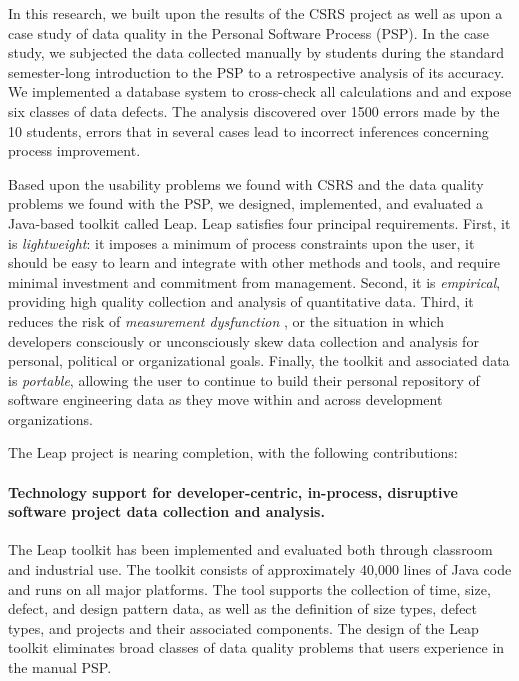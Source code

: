 In this research, we built upon the results of
the CSRS project as well as upon a case study of data quality in the Personal
Software Process (PSP).  In the case study, we subjected the data collected
manually by students during the standard semester-long introduction to the
PSP to a retrospective analysis of its accuracy.  We implemented a database
system to cross-check all calculations and and expose six classes of data
defects.  The analysis discovered over 1500 errors made by the 10 students,
errors that in several cases lead to incorrect inferences concerning
process improvement. 

Based upon the usability problems we found with CSRS and the data quality
problems we found with the PSP, we designed, implemented, and evaluated a
Java-based toolkit called Leap.  Leap satisfies four principal
requirements. First, it is {\em lightweight}: it imposes a minimum of
process constraints upon the user, it should be easy to learn and integrate
with other methods and tools, and require minimal investment and commitment
from management.  Second, it is {\em empirical}, providing high quality
collection and analysis of quantitative data.  Third, it reduces the risk
of {\em measurement dysfunction} \cite{Austin96}, or the situation in which
developers consciously or unconsciously skew data collection and analysis
for personal, political or organizational goals.  Finally, the toolkit and
associated data is {\em portable}, allowing the user to continue to build
their personal repository of software engineering data as they move within
and across development organizations.

The Leap project is nearing completion, with the following contributions:
  
\vspace*{-.15in} \paragraph{Technology support for developer-centric, in-process, disruptive 
  software project data collection and analysis.} The Leap toolkit has been
implemented and evaluated both through classroom and industrial use.  The
toolkit consists of approximately 40,000 lines of Java code and runs on all
major platforms.  The tool supports the collection of time, size, defect,
and design pattern data, as well as the definition of size types, defect
types, and projects and their associated components. The design of the Leap
toolkit eliminates broad classes of data quality problems that users
experience in the manual PSP.

